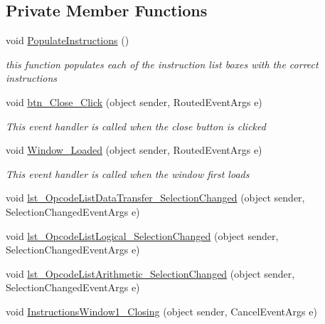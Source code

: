\subsection*{Private Member Functions}
\begin{DoxyCompactItemize}
\item 
void \hyperlink{class_c_p_u___o_s___simulator_1_1_instructions_window_a52685f2ecc3d1cf7216716401d2621e0}{Populate\+Instructions} ()
\begin{DoxyCompactList}\small\item\em this function populates each of the instruction list boxes with the correct instructions \end{DoxyCompactList}\item 
void \hyperlink{class_c_p_u___o_s___simulator_1_1_instructions_window_a5fd3510dda95cf73b61af11ccacd81cd}{btn\+\_\+\+Close\+\_\+\+Click} (object sender, Routed\+Event\+Args e)
\begin{DoxyCompactList}\small\item\em This event handler is called when the close button is clicked \end{DoxyCompactList}\item 
void \hyperlink{class_c_p_u___o_s___simulator_1_1_instructions_window_a7d985ca63f2e27bc03a2198ec6879b49}{Window\+\_\+\+Loaded} (object sender, Routed\+Event\+Args e)
\begin{DoxyCompactList}\small\item\em This event handler is called when the window first loads \end{DoxyCompactList}\item 
void \hyperlink{class_c_p_u___o_s___simulator_1_1_instructions_window_a380aec4afa9900f7dd9ef964a5b86503}{lst\+\_\+\+Opcode\+List\+Data\+Transfer\+\_\+\+Selection\+Changed} (object sender, Selection\+Changed\+Event\+Args e)
\item 
void \hyperlink{class_c_p_u___o_s___simulator_1_1_instructions_window_a245baef3e788a01e6cf752f2c48f1843}{lst\+\_\+\+Opcode\+List\+Logical\+\_\+\+Selection\+Changed} (object sender, Selection\+Changed\+Event\+Args e)
\item 
void \hyperlink{class_c_p_u___o_s___simulator_1_1_instructions_window_ab4001352180ad08e3b335bf80c7dd9b8}{lst\+\_\+\+Opcode\+List\+Arithmetic\+\_\+\+Selection\+Changed} (object sender, Selection\+Changed\+Event\+Args e)
\item 
void \hyperlink{class_c_p_u___o_s___simulator_1_1_instructions_window_ac5b4dea0d3fe645b7f0bf9201cb0ad1c}{Instructions\+Window1\+\_\+\+Closing} (object sender, Cancel\+Event\+Args e)

\end{DoxyCompactItemize}
